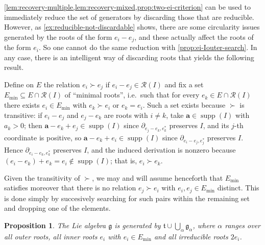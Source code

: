 \documentclass[11pt,letterpaper,reqno]{amsart}
\newtheorem{proposition}[proposition]{Proposition}
\theoremstyle{remark}
\theoremstyle{definition}
\newcommand{\supp}[0]{\ensuremath{\operatorname{supp}}}
\newcommand{\R}{\mathcal R}
\begin{document}
\cref{lem:recovery-multiple,lem:recovery-mixed,prop:two-ei-criterion} can be used to immediately reduce the set of generators by discarding those that are reducible. However, as \cref{ex:reducible-not-discardable} shows, there are some circularity issues generated by the roots of the form $e_i-e_j$, and these actually affect the roots of the form $e_i$. So one cannot do the same reduction with \cref{prop:ei-Iouter-search}. In any case, there is an intelligent way of discarding roots that yields the following result.

Define on $E$ the relation $e_i\succ e_j$ if $e_i-e_j\in\R(I)$ and fix a set $E_\mathrm{min}\subseteq E\cap\R(I)$ of ``minimal roots'', i.e.~such that for every $e_k\in E \cap\R(I)$ there exists $e_i\in E_\mathrm{min}$ with $e_k\succ e_i$ or $e_k=e_i$. Such a set exists because $\succ$ is transitive: if $e_i-e_j$ and $e_j-e_k$ are roots with $i\neq k$, take $\mathbf a\in\supp(I)$ with $a_k>0$; then $\mathbf a-e_k+e_j\in\supp(I)$ since $\partial_{e_j-e_k,e_k^*}$ preserves $I$, and its $j$-th coordinate is positive, so $\mathbf a-e_k+e_i\in\supp(I)$ since $\partial_{e_i-e_j,e_j^*}$ preserves $I$. Hence $\partial_{e_i-e_k,e_k^*}$ preserves $I$, and the induced derivation is nonzero because $(e_i-e_k)+e_k=e_i\notin\supp(I)$; that is, $e_i\succ e_k$.

Given the transitivity of $\succ$, we may and will assume henceforth that $E_\mathrm{min}$ satisfies moreover that there is no relation $e_j\succ e_i$ with $e_i,e_j\in E_{\mathrm{min}}$ distinct. This is done simply by succesively searching for such pairs within the remaining set and dropping one of the elements.

\begin{proposition}\label{lem:discardable}
The Lie algebra $\mathfrak g$ is generated by $\mathfrak t\cup\bigcup_{\alpha}\mathfrak g_\alpha$, where $\alpha$ ranges over all outer roots, all inner roots $e_i$ with $e_i\in E_\mathrm{min}$ and all irreducible roots $2e_i$.
\end{proposition}
\end{document}
